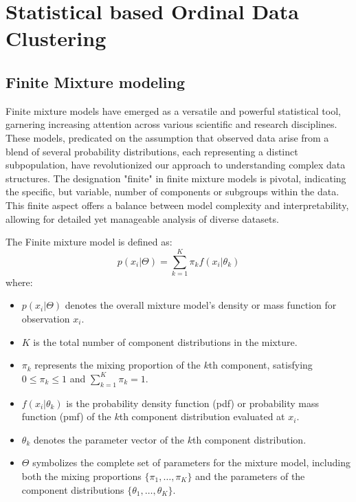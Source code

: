 \documentclass{article}
\begin{document}

\section{Statistical based Ordinal Data Clustering}

\subsection{Finite Mixture modeling}

Finite mixture models have emerged as a versatile and powerful statistical tool, garnering increasing attention across various scientific and research disciplines. These models, predicated on the assumption that observed data arise from a blend of several probability distributions, each representing a distinct subpopulation, have revolutionized our approach to understanding complex data structures. The designation "finite" in finite mixture models is pivotal, indicating the specific, but variable, number of components or subgroups within the data. This finite aspect offers a balance between model complexity and interpretability, allowing for detailed yet manageable analysis of diverse datasets.

The Finite mixture model is defined as:
\begin{equation}
p(x_i|\Theta) = \sum_{k=1}^{K} \pi_k f(x_i|\theta_k)
\end{equation}
where:
\begin{itemize}
    \item $p(x_i|\Theta)$ denotes the overall mixture model's density or mass function for observation $x_i$.
    \item $K$ is the total number of component distributions in the mixture.
    \item $\pi_k$ represents the mixing proportion of the $k$th component, satisfying $0 \leq \pi_k \leq 1$ and $\sum_{k=1}^{K} \pi_k = 1$.
    \item $f(x_i|\theta_k)$ is the probability density function (pdf) or probability mass function (pmf) of the $k$th component distribution evaluated at $x_i$.
    \item $\theta_k$ denotes the parameter vector of the $k$th component distribution.
    \item $\Theta$ symbolizes the complete set of parameters for the mixture model, including both the mixing proportions $\{\pi_1, \ldots, \pi_K\}$ and the parameters of the component distributions $\{\theta_1, \ldots, \theta_K\}$.
\end{itemize}
\end{document}
